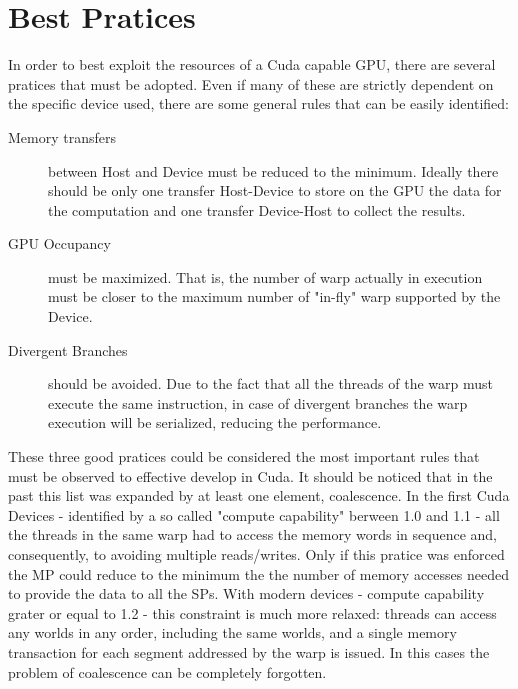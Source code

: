 \section{Best Pratices}
In order to best exploit the resources of a Cuda capable GPU, there are several pratices that must be adopted. Even if many of these are strictly dependent on the specific device used, there are some general rules that can be easily identified:
\begin{description}
\item[Memory transfers] between Host and Device must be reduced to the minimum. Ideally there should be only one transfer Host-Device to store on the GPU the data for the computation and one transfer Device-Host to collect the results.
\item[GPU Occupancy] must be maximized. That is, the number of warp actually in execution must be closer to the maximum number of "in-fly" warp supported by the Device.\item[Divergent Branches] should be avoided. Due to the fact that all the threads of the warp must execute the same instruction, in case of divergent branches the warp execution will be serialized, reducing the performance.
\end{description}
These three good pratices could be considered the most important rules that must be observed to effective develop in Cuda. It should be noticed that in the past this list was expanded by at least one element, coalescence. In the first Cuda Devices - identified by a so called "compute capability" berween 1.0 and 1.1 - all the threads in the same warp had to access the memory words in sequence and, consequently, to avoiding multiple reads/writes. Only if this pratice was enforced the MP could reduce to the minimum the the number of memory accesses needed to provide the data to all the SPs. With modern devices - compute capability grater or equal to 1.2 - this constraint is much more relaxed: threads can access any worlds in any order, including the same worlds, and a single memory transaction for each segment addressed by the warp is issued. In this cases the problem of coalescence can be completely forgotten.
